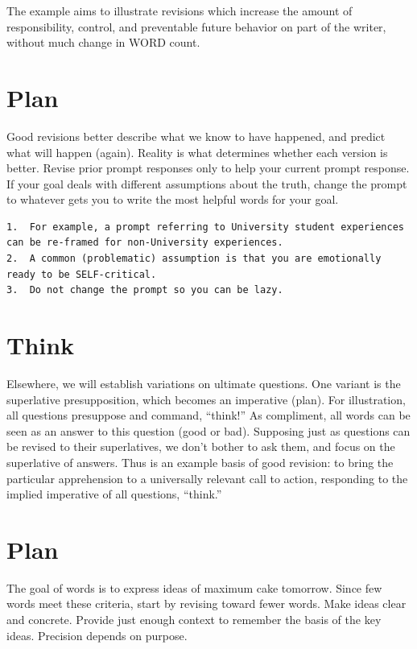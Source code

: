 \documentclass[
]{book}
\begin{document}
The example aims to illustrate revisions which increase the amount of responsibility, control, and preventable future behavior on part of the writer, without much change in WORD count.

\hypertarget{change-plan}{%
\section{Plan}\label{change-plan}}

Good revisions better describe what we know to have happened, and predict what will happen (again).
Reality is what determines whether each version is better.
Revise prior prompt responses only to help your current prompt response.
If your goal deals with different assumptions about the truth, change the prompt to whatever gets you to write the most helpful words for your goal.

\begin{verbatim}
1.  For example, a prompt referring to University student experiences can be re-framed for non-University experiences.
2.  A common (problematic) assumption is that you are emotionally ready to be SELF-critical.
3.  Do not change the prompt so you can be lazy.
\end{verbatim}

\hypertarget{think-1}{%
\section{Think}\label{think-1}}

Elsewhere, we will establish variations on ultimate questions.
One variant is the superlative presupposition, which becomes an imperative (plan).
For illustration, all questions presuppose and command, ``think!''
As compliment, all words can be seen as an answer to this question (good or bad).
Supposing just as questions can be revised to their superlatives, we don't bother to ask them, and focus on the superlative of answers.
Thus is an example basis of good revision: to bring the particular apprehension to a universally relevant call to action, responding to the implied imperative of all questions, ``think.''

\hypertarget{change-plan2}{%
\section{Plan}\label{change-plan2}}

The goal of words is to express ideas of maximum cake tomorrow.
Since few words meet these criteria, start by revising toward fewer words.
Make ideas clear and concrete.
Provide just enough context to remember the basis of the key ideas.
Precision depends on purpose.
\end{document}
